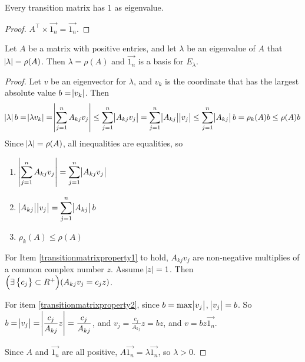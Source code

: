 \begin{theorem}
    Every transition matrix has $1$ as eigenvalue.    
\end{theorem}
\begin{proof}
    $A^\top \times  \vec{1_n} = \vec{1_n}$.
\end{proof}

\begin{theorem}
    Let $A$ be a matrix with positive entries, and let $\lambda$ be an eigenvalue of $A$ that $\abs{\lambda} = \rho(A)$. Then $\lambda = \rho(A)$ and $\vec{1_n}$ is a basis for $E_\lambda$.
\end{theorem}
\begin{proof}
    Let $v$ be an eigenvector for $\lambda$, and $v_k$ is the coordinate that has the largest absolute value $b = \abs{v_k}$. Then
    \begin{equation*}
        \abs{\lambda} b = \abs{\lambda v_k} = \abs{\sum_{j=1}^n A_{kj} v_j} \leq \sum_{j=1}^n \abs{A_{kj} v_j} = \sum_{j=1}^n \abs{A_{kj}} \abs{v_j} \leq \sum_{j=1}^n \abs{A_{kj}} b = \rho_k(A) b \leq \rho(A) b
    \end{equation*}
    Since $\abs{\lambda} = \rho(A)$, all inequalities are equalities, so
    \begin{enumerate}
        \item \label{transitionmatrixproperty1}$\displaystyle \abs{\sum_{j=1}^n A_{kj} v_j} = \sum_{j=1}^n \abs{A_{kj} v_j}$
        \item \label{transitionmatrixproperty2}$\displaystyle \abs{A_{kj}} \abs{v_j} = \sum_{j=1}^n \abs{A_{kj}} b$
        \item \label{transitionmatrixproperty3}$\rho_k(A) \leq \rho(A)$
    \end{enumerate}
    
    For Item \ref{transitionmatrixproperty1} to hold, $A_{kj} v_j$ are non-negative multiplies of a common complex number $z$. Assume $\abs{z}=1$. Then $\mleft(\exists \set{c_j} \subset R^+ \mright) (A_{kj} v_j = c_j z)$.
    
    For item \ref{transitionmatrixproperty2}, since $b = \max \abs{v_j}$, $\abs{v_j} = b$. So $\displaystyle b = \abs{v_j} = \abs{\frac{c_j}{A_{kj}} z} = \frac{c_j}{A_{kj}}$, and $\displaystyle v_j = \frac{c_j}{A_{kj}} z = bz$, and $v = bz \vec{1_n}$.
    
    Since $A$ and $\vec{1_n}$ are all positive, $A \vec{1_n} = \lambda \vec{1_n}$, so $\lambda > 0$.
\end{proof}

